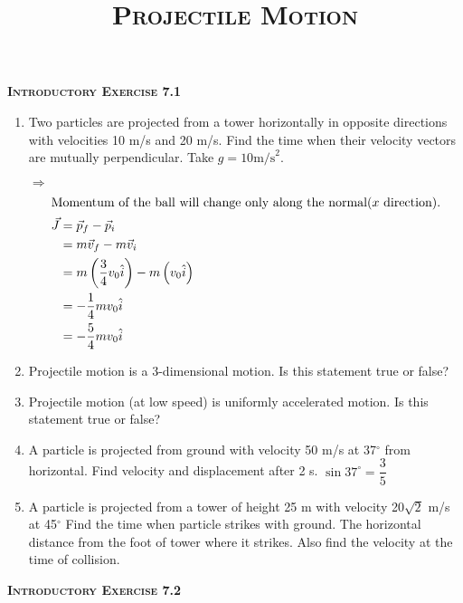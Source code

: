 \documentclass{article}
\title{\textsc{Projectile Motion}}
\date{}
\renewcommand{\frac}[2]{\dfrac{#1}{#2}}
\newenvironment{solution}{\par\noindent\color{red!85!black}$\Rightarrow$\vspace{0em}}{}
\begin{document}
\maketitle

\begin{center}
    \textsc{\textbf{Introductory Exercise 7.1}}
\end{center}

\begin{enumerate}
    \item Two particles are projected from a tower horizontally in opposite directions with velocities 10 m/s and 20 m/s. Find the time when their velocity vectors are mutually perpendicular. Take \( g = 10 \text{m/s}^2 \).
        \begin{solution}
            \begin{align*}
                \intertext{Momentum of the ball will change only along the normal($x$ direction).}
                \vec{J} &= \vec{p}_f-\vec{p}_i\\
                &= m\vec{v}_f-m\vec{v}_i\\
                &= m\left(\dfrac{3}{4}v_0\hat{i}\right)-m\left(v_0\hat{i}\right)\\
                &= -\dfrac{1}{4}mv_0\hat{i}\\
                &= -\dfrac{5}{4}mv_0\hat{i}
            \end{align*}
        \end{solution}
    \item Projectile motion is a 3-dimensional motion. Is this statement true or false?
    \item Projectile motion (at low speed) is uniformly accelerated motion. Is this statement true or false?
    \item A particle is projected from ground with velocity 50 m/s at 37\(^{\circ}\) from horizontal. Find velocity and displacement after 2 s. \( \sin 37^{\circ} = \frac{3}{5} \)
    \item A particle is projected from a tower of height 25 m with velocity 20\(\sqrt{2}\) m/s at 45\(^{\circ}\) Find the time when particle strikes with ground. The horizontal distance from the foot of tower where it strikes. Also find the velocity at the time of collision.
\end{enumerate}
    \begin{center}
        \textsc{\textbf{Introductory Exercise 7.2}}
    \end{center}
\end{document}
